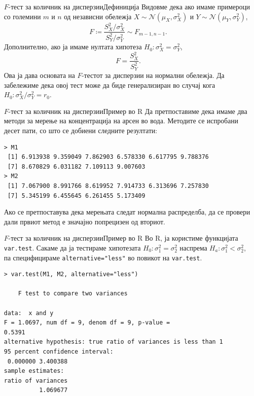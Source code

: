 \documentclass[hyperref={unicode}, xcolor={svgnames, table},
usepdftitle=false]{beamer}
\theoremstyle{remark}
\begin{document}
\begin{frame}{\(F\)-тест за количник на дисперзии}{Дефиниција}
  Видовме дека ако имаме примероци со големини \(m\) и \(n\) од независни
  обележја \(X \sim \mathcal{N}(\mu_X, \sigma_X^2)\) и
  \(Y \sim \mathcal{N}(\mu_Y, \sigma_Y^2)\),
  \[
    F \coloneqq \frac{S_X^2 / {\sigma_X^2}}{S_Y^2 / {\sigma_Y^2}} \sim F_{m - 1,
      n - 1}\text{.}
  \]
  Дополнително, ако ја имаме нултата хипотеза \(H_0 \colon \sigma_X^2 =
  \sigma_Y^{2}\),
  \[
    F = \frac{S_X^2}{S_Y^2}\text{.}
  \]
  Ова ја дава основата на \(F\)-тестот за дисперзии на нормални обележја.  Да
  забележиме дека овој тест може да биде генерализиран во случај кога
  \(H_0 \colon \sigma_X^2 / {\sigma_Y^2} = r_0\).
\end{frame}

\begin{frame}[fragile]{\(F\)-тест за количник на дисперзии}{Пример во R}
  Да претпоставиме дека имаме два методи за мерење на концентрација на арсен во
  вода.  Методите се испробани десет пати, со што се добиени следните резултати:
\begin{verbatim}
> M1
 [1] 6.913938 9.359049 7.862903 6.578330 6.617795 9.788376
 [7] 8.670829 6.031182 7.109113 9.007603
> M2
 [1] 7.067900 8.991766 8.619952 7.914733 6.313696 7.257830
 [7] 5.345199 6.455645 6.261455 5.173409
\end{verbatim}

  Ако се претпоставува дека мерењата следат нормална распределба, да се провери
  дали првиот метод е значајно попрецизен од вториот.
\end{frame}

\begin{frame}[fragile]{\(F\)-тест за количник на дисперзии}{Пример во
    R}
  Во R, ја користиме функцијата \texttt{var.test}.  Сакаме да ја
  тестираме хипотезата \(H_0 \colon \sigma_1^2 = \sigma_2^2\) наспрема
  \(H_a \colon \sigma_1^2 < \sigma_2^2\), па специфицираме
  \texttt{alternative="less"} во повикот на \texttt{var.test}.
\begin{verbatim}
> var.test(M1, M2, alternative="less")

	F test to compare two variances

data:  x and y
F = 1.0697, num df = 9, denom df = 9, p-value =
0.5391
alternative hypothesis: true ratio of variances is less than 1
95 percent confidence interval:
 0.000000 3.400388
sample estimates:
ratio of variances
          1.069677
\end{verbatim}
\end{frame}
\end{document}
